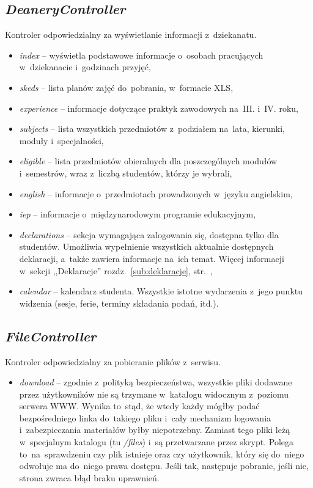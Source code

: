 \documentclass[a4paper,12pt,oneside]{report}
\begin{document}
\subsection{\emph{DeaneryController}}
\label{con:deanery}
  Kontroler odpowiedzialny za wyświetlanie informacji z~dziekanatu.
\begin{itemize}
  \item \emph{index} -- wyświetla podstawowe informacje o~osobach pracujących w~dziekanacie i~godzinach przyjęć,
  \item \emph{skeds} -- lista planów zajęć do~pobrania, w~formacie XLS,
  \item \emph{experience} -- informacje dotyczące praktyk zawodowych na~III. i~IV. roku,
  \item \emph{subjects} -- lista wszystkich przedmiotów z~podziałem na~lata, kierunki, moduły i~specjalności,
  \item \emph{eligible} -- lista przedmiotów obieralnych dla poszczególnych modułów i~semestrów, wraz z~liczbą studentów, którzy je wybrali,
  \item \emph{english} -- informacje o~przedmiotach prowadzonych w~języku angielskim,
  \item \emph{iep} -- informacje o~międzynarodowym programie edukacyjnym,
  \item \emph{declarations} -- sekcja wymagająca zalogowania się, dostępna tylko dla studentów. Umożliwia wypełnienie wszystkich aktualnie dostępnych deklaracji, a~także zawiera informacje na~ich temat. Więcej informacji w~sekcji ,,Deklaracje'' rozdz.~\ref{sub:deklaracje}, str.~\pageref{sub:deklaracje},
  \item \emph{calendar} -- kalendarz studenta. Wszystkie istotne wydarzenia z~jego punktu widzenia (sesje, ferie, terminy składania podań, itd.).
\end{itemize}

\subsection{\emph{FileController}}
\label{con:file}
  Kontroler odpowiedzialny za pobieranie plików z~serwisu.
\begin{itemize}
  \item \emph{download} -- zgodnie z~polityką bezpieczeństwa, wszystkie pliki dodawane przez użytkowników nie są trzymane w~katalogu widocznym z~poziomu serwera WWW. Wynika to~stąd, że wtedy każdy mógłby podać bezpośredniego linka do~takiego pliku i~cały mechanizm logowania i~zabezpieczania materiałów byłby niepotrzebny. Zamiast tego pliki leżą w~specjalnym katalogu (tu \emph{/files}) i~są przetwarzane przez skrypt. Polega to~na~sprawdzeniu czy plik istnieje oraz czy użytkownik, który się do~niego odwołuje ma do~niego prawa dostępu. Jeśli tak, następuje pobranie, jeśli nie, strona zwraca błąd braku uprawnień.
\end{itemize}
\end{document}
